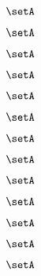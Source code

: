 \begin{forslides}
    \begin{equation}
        \label{eq:slides-processes-123}
        \setA
    \end{equation}

    \begin{equation}
        \label{eq:slides-processes-124}
        \setA
    \end{equation}

    \begin{equation}
        \label{eq:slides-processes-125}
        \setA
    \end{equation}

    \begin{equation}
        \label{eq:slides-processes-126}
        \setA
    \end{equation}

    \begin{equation}
        \label{eq:slides-processes-127}
        \setA
    \end{equation}

    \begin{equation}
        \label{eq:slides-processes-128}
        \setA
    \end{equation}

    \begin{equation}
        \label{eq:slides-processes-129}
        \setA
    \end{equation}
    
    \begin{equation}
        \label{eq:slides-processes-130}
        \setA
    \end{equation}

    \begin{equation}
        \label{eq:slides-processes-131}
        \setA
    \end{equation}

    \begin{equation}
        \label{eq:slides-processes-132}
        \setA
    \end{equation}

    \begin{equation}
        \label{eq:slides-processes-133}
        \setA
    \end{equation}

    \begin{equation}
        \label{eq:slides-processes-134}
        \setA
    \end{equation}

    \begin{equation}
        \label{eq:slides-processes-135}
        \setA
    \end{equation}


\end{forslides}
